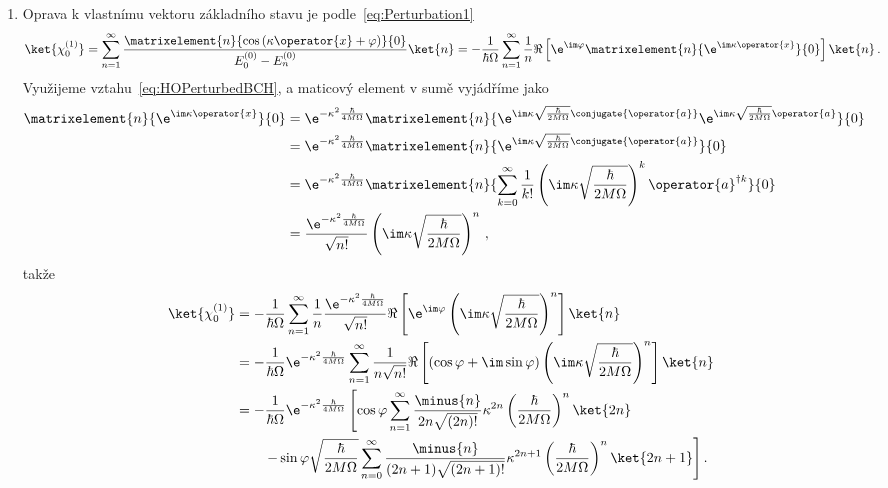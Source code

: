 \begin{solution}
\begin{enumerate}
	\item
		Oprava k vlastnímu vektoru základního stavu je podle~\eqref{eq:Perturbation1}
		\begin{equation}
			\ket{\chi_{0}^{(1)}}
				=\sum_{n=1}^{\infty}\frac{\matrixelement{n}{\cos\left(\kappa\operator{x}+\varphi\right)}{0}}{E_{0}^{(0)}-E_{n}^{(0)}}\ket{n}
				=-\frac{1}{\hbar\Omega}\sum_{n=1}^{\infty}\frac{1}{n}\Re\left[\e^{\im\varphi}\matrixelement{n}{\e^{\im\kappa\operator{x}}}{0}\right]\ket{n}\,.
		\end{equation}
		Využijeme vztahu~\eqref{eq:HOPerturbedBCH}, a maticový element v sumě vyjádříme jako
		\begin{align}
				\matrixelement{n}{\e^{\im\kappa\operator{x}}}{0}
					&=\e^{-\kappa^{2}\frac{\hbar}{4M\Omega}}\matrixelement{n}{\e^{\im\kappa\sqrt{\frac{\hbar}{2M\Omega}}\conjugate{\operator{a}}}\e^{\im\kappa\sqrt{\frac{\hbar}{2M\Omega}}\operator{a}}}{0}\nonumber\\
					&=\e^{-\kappa^{2}\frac{\hbar}{4M\Omega}}\matrixelement{n}{\e^{\im\kappa\sqrt{\frac{\hbar}{2M\Omega}}\conjugate{\operator{a}}}}{0}\nonumber\\
					&=\e^{-\kappa^{2}\frac{\hbar}{4M\Omega}}\matrixelement{n}{\sum_{k=0}^{\infty}\frac{1}{k!}\left(\im\kappa\sqrt{\frac{\hbar}{2M\Omega}}\right)^{k}\operator{a}^{\dagger k}}{0}\nonumber\\
					&=\frac{\e^{-\kappa^{2}\frac{\hbar}{4M\Omega}}}{\sqrt{n!}}\left(\im\kappa\sqrt{\frac{\hbar}{2M\Omega}}\right)^{n}\,,
			\end{align}
			takže
			\begin{align}
				\ket{\chi_{0}^{(1)}}
					&=-\frac{1}{\hbar\Omega}\sum_{n=1}^{\infty}\frac{1}{n}\frac{\e^{-\kappa^{2}\frac{\hbar}{4M\Omega}}}{\sqrt{n!}}\Re\left[\e^{\im\varphi}\left(\im\kappa\sqrt{\frac{\hbar}{2M\Omega}}\right)^{n}\right]\ket{n}\nonumber\\
					&=-\frac{1}{\hbar\Omega}\e^{-\kappa^{2}\frac{\hbar}{4M\Omega}}\sum_{n=1}^{\infty}\frac{1}{n\sqrt{n!}}\Re\left[\left(\cos{\varphi}+\im\sin{\varphi}\right)\left(\im\kappa\sqrt{\frac{\hbar}{2M\Omega}}\right)^{n}\right]\ket{n}\nonumber\\
					&=-\frac{1}{\hbar\Omega}\e^{-\kappa^{2}\frac{\hbar}{4M\Omega}}\left[
						\cos{\varphi}\sum_{n=1}^{\infty}\frac{\minus{n}}{2n\sqrt{(2n)!}}\kappa^{2n}\left(\frac{\hbar}{2M\Omega}\right)^{n}\ket{2n}\right.\nonumber\\
					&\qquad\left.-\sin{\varphi}\sqrt{\frac{\hbar}{2M\Omega}}\sum_{n=0}^{\infty}\frac{\minus{n}}{(2n+1)\sqrt{(2n+1)!}}\kappa^{2n+1}\left(\frac{\hbar}{2M\Omega}\right)^{n}\ket{2n+1}\right].

\end{align}
\end{enumerate}
\end{solution}
